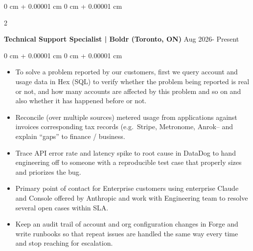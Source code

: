 \documentclass[10pt, letterpaper]{article}
\newenvironment{highlights}{
    \begin{itemize}[
        topsep=0.10 cm,
        parsep=0.10 cm,
        partopsep=0pt,
        itemsep=0pt,
        leftmargin=0 cm + 10pt
    ]
}{
    \end{itemize}
} %
\newenvironment{onecolentry}{
    \begin{adjustwidth}{
        0 cm + 0.00001 cm
    }{
        0 cm + 0.00001 cm
    }
}{
    \end{adjustwidth}
} %
\newenvironment{twocolentry}[2][]{
    \onecolentry
    \def\secondColumn{#2}
    \setcolumnwidth{\fill, 4.5 cm}
    \begin{paracol}{2}
}{
    \switchcolumn \raggedleft \secondColumn
    \end{paracol}
    \endonecolentry
} %
\begin{document}
        \begin{twocolentry}{
            {Aug 2026- Present}
        }
            \textbf{Technical Support Specialist | Boldr (Toronto, ON)}\end{twocolentry}
        \vspace{0.10 cm}
        \begin{onecolentry}
            \begin{highlights}
                \item To solve a problem reported by our customers, first we query account and usage data in Hex (SQL) to verify whether the problem being reported is real or not, and how many accounts are affected by this problem and so on and also whether it has happened before or not.
                \item Reconcile (over multiple sources) metered usage from applications against invoices corresponding tax records (e.g.\ Stripe, Metronome, Anrok– and explain “gaps” to finance / business.
                \item Trace API error rate and latency spike to root cause in DataDog to hand engineering off to someone with a reproducible test case that properly sizes and priorizes the bug.
                \item Primary point of contact for Enterprise customers using enterprise Claude and Console offered by Anthropic and work with Engineering team to resolve several open cases within SLA.
                \item Keep an audit trail of account and org configuration changes in Forge and write runbooks so that repeat issues are handled the same way every time and stop reaching for escalation.
            \end{highlights}
        \end{onecolentry}
\end{document}
